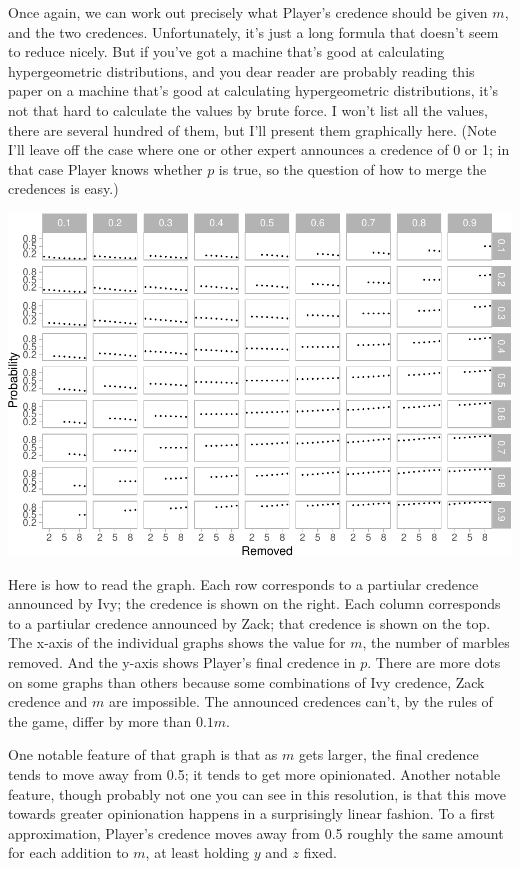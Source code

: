 \documentclass[
  12pt,
]{article}
\begin{document}
Once again, we can work out precisely what Player's credence should be
given \(m\), and the two credences. Unfortunately, it's just a long
formula that doesn't seem to reduce nicely. But if you've got a machine
that's good at calculating hypergeometric distributions, and you dear
reader are probably reading this paper on a machine that's good at
calculating hypergeometric distributions, it's not that hard to
calculate the values by brute force. I won't list all the values, there
are several hundred of them, but I'll present them graphically here.
(Note I'll leave off the case where one or other expert announces a
credence of 0 or 1; in that case Player knows whether \(p\) is true, so
the question of how to merge the credences is easy.)

\includegraphics{mixing-experts_files/figure-latex/unnamed-chunk-2-1.pdf}

Here is how to read the graph. Each row corresponds to a partiular
credence announced by Ivy; the credence is shown on the right. Each
column corresponds to a partiular credence announced by Zack; that
credence is shown on the top. The x-axis of the individual graphs shows
the value for \(m\), the number of marbles removed. And the y-axis shows
Player's final credence in \(p\). There are more dots on some graphs
than others because some combinations of Ivy credence, Zack credence and
\(m\) are impossible. The announced credences can't, by the rules of the
game, differ by more than \(0.1m\).

One notable feature of that graph is that as \(m\) gets larger, the
final credence tends to move away from 0.5; it tends to get more
opinionated. Another notable feature, though probably not one you can
see in this resolution, is that this move towards greater opinionation
happens in a surprisingly linear fashion. To a first approximation,
Player's credence moves away from 0.5 roughly the same amount for each
addition to \(m\), at least holding \(y\) and \(z\) fixed.
\end{document}
